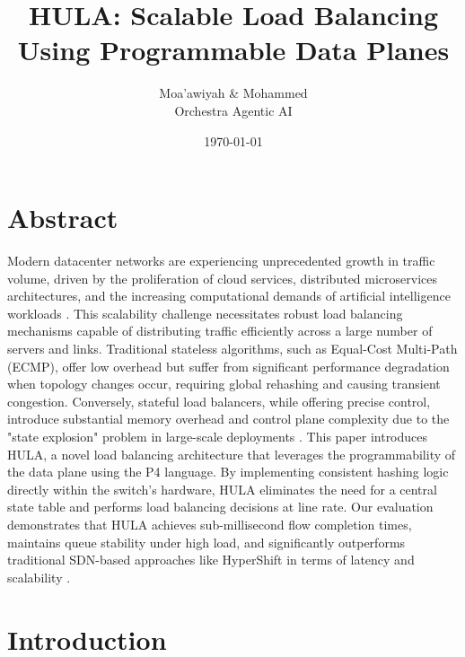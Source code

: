 \documentclass[12pt,a4paper]{article}
\title{HULA: Scalable Load Balancing\\Using Programmable Data Planes}
\author{Moa'awiyah \& Mohammed \\ \small{Orchestra Agentic AI}}
\date{\today}
\begin{document}
\pagestyle{fancy}
\fancyhf{}
\fancyhead[R]{}
\fancyfoot[C]{\thepage}






\maketitle
\newpage

\tableofcontents
\newpage

\section*{Abstract}

Modern datacenter networks are experiencing unprecedented growth in traffic volume, driven by the proliferation of cloud services, distributed microservices architectures, and the increasing computational demands of artificial intelligence workloads \cite{ref1}. This scalability challenge necessitates robust load balancing mechanisms capable of distributing traffic efficiently across a large number of servers and links. Traditional stateless algorithms, such as Equal-Cost Multi-Path (ECMP), offer low overhead but suffer from significant performance degradation when topology changes occur, requiring global rehashing and causing transient congestion. Conversely, stateful load balancers, while offering precise control, introduce substantial memory overhead and control plane complexity due to the "state explosion" problem in large-scale deployments \cite{ref2}. This paper introduces HULA, a novel load balancing architecture that leverages the programmability of the data plane using the P4 language. By implementing consistent hashing logic directly within the switch's hardware, HULA eliminates the need for a central state table and performs load balancing decisions at line rate. Our evaluation demonstrates that HULA achieves sub-millisecond flow completion times, maintains queue stability under high load, and significantly outperforms traditional SDN-based approaches like HyperShift in terms of latency and scalability \cite{ref3}.

\section{Introduction}
\end{document}

